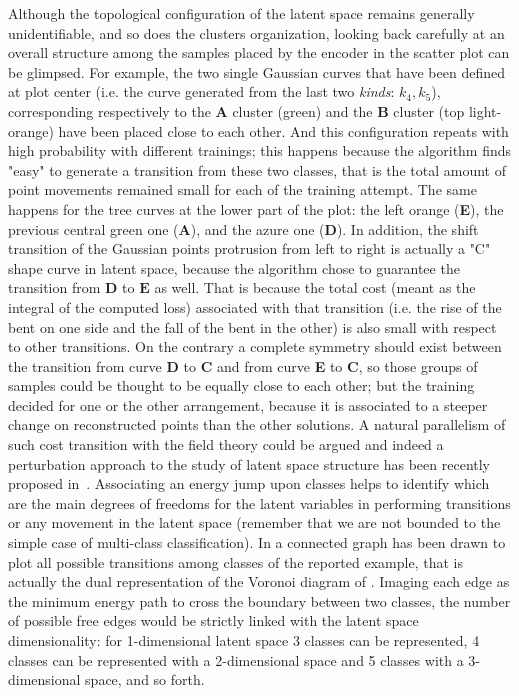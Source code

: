 Although the topological configuration of the latent space remains generally unidentifiable, and so does the clusters organization, looking back carefully at \Figure{\ref{fig:step_1}} an overall structure among the samples placed by the encoder in the scatter plot can be glimpsed. For example, the two single Gaussian curves that have been defined at plot center (i.e. the curve generated from the last two \textit{kinds}: $k_4, k_5$), corresponding respectively to the $\bm{A}$ cluster (green) and the $\bm{B}$ cluster (top light-orange) have been placed close to each other. And this configuration repeats with high probability with different trainings; this happens because the algorithm finds "easy" to generate a transition from these two classes, that is the total amount of point movements remained small for each of the training attempt. The same happens for the tree curves at the lower part of the plot: the left orange (\textbf{E}), the previous central green one (\textbf{A}), and the azure one (\textbf{D}). In addition, the shift transition of the Gaussian points protrusion from left to right is actually a "C" shape curve in latent space, because the algorithm chose to guarantee the transition from $\bm{D}$ to $\bm{E}$ as well. That is because the total cost (meant as the integral of the computed loss) associated with that transition (i.e. the rise of the bent on one side and the fall of the bent in the other) is also small with respect to other transitions. On the contrary a complete symmetry should exist between the transition from curve \textbf{D} to \textbf{C} and from curve \textbf{E} to \textbf{C}, so those groups of samples could be thought to be equally close to each other; but the training decided for one or the other arrangement, because it is associated to a steeper change on reconstructed points than the other solutions. A natural parallelism of such cost transition with the field theory could be argued and indeed a perturbation approach to the study of latent space structure has been recently proposed in~\cite{andrsterr2019perturbation}. Associating an energy jump upon classes helps to identify which are the main degrees of freedoms for the latent variables in performing transitions or any movement in the latent space (remember that we are not bounded to the simple case of multi-class classification).
In \Figure{\ref{fig:voronoi_2d}} a connected graph has been drawn to plot all possible transitions among classes of the reported example, that is actually the dual representation of the Voronoi diagram of \Figure{\ref{fig:voronoi_ls}}. Imaging each edge as the minimum energy path to cross the boundary between two classes, the number of possible free edges would be strictly linked with the latent space dimensionality: for 1-dimensional latent space 3 classes can be represented, 4 classes can be represented with a 2-dimensional space and 5 classes with a 3-dimensional space, and so forth. 
